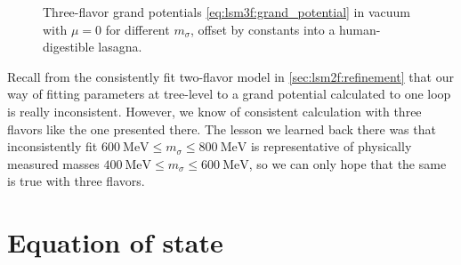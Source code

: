 \begin{figure}
\caption{\label{fig:lsm3f:potential_sigma_mass}%
Three-flavor grand potentials \eqref{eq:lsm3f:grand_potential} in vacuum with $\mu=0$ for different $m_\sigma$,
offset by constants into a human-digestible lasagna.
}
\end{figure}

Recall from the consistently fit two-flavor model in \cref{sec:lsm2f:refinement}
that our way of fitting parameters at tree-level to a grand potential calculated to one loop is really inconsistent.
However, we know of consistent calculation with three flavors like the one presented there.
The lesson we learned back there was that inconsistently fit $\SI{600}{\mega\electronvolt} \leq m_\sigma \leq \SI{800}{\mega\electronvolt}$
is representative of physically measured masses $\SI{400}{\mega\electronvolt} \leq m_\sigma \leq \SI{600}{\mega\electronvolt}$,
so we can only hope that the same is true with three flavors.

\section{Equation of state}

